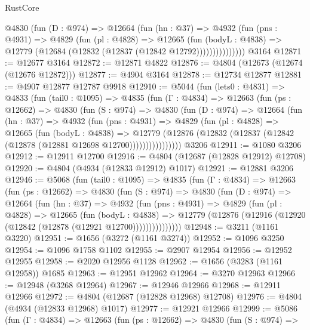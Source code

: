 \begin{lexlean}{RustCore}
\begin{coremodule}
              @4830
                (fun (D : @974) =>
                @12664
                  (fun (hn : @37) =>
                  @4932
                    (fun (pns : @4931) =>
                    @4829
                      (fun (pl : @4828) =>
                      @12665
                        (fun (bodyL : @4838) =>
                        @12779 (@12684 (@12832 (@12837 (@12842 @12792)))))))))))))))
    @3164
@12871 := @12677 @3164
@12872 := @12871 @4822
@12876 := @4804 (@12673 (@12674 (@12676 @12872)))
@12877 := @4904 @3164
@12878 := @12734 @12877
@12881 := @4907 @12877 @12787 @9918
@12910 := @5044
    (fun (lets0 : @4831) =>
    @4833
      (fun (tail0 : @1095) =>
      @4835
        (fun (Γ : @4834) =>
        @12663
          (fun (ps : @12662) =>
          @4830
            (fun (S : @974) =>
            @4830
              (fun (D : @974) =>
              @12664
                (fun (hn : @37) =>
                @4932
                  (fun (pns : @4931) =>
                  @4829
                    (fun (pl : @4828) =>
                    @12665
                      (fun (bodyL : @4838) =>
                      @12779
                        (@12876
                          (@12832 (@12837 (@12842 (@12878 (@12881 @12698 @12700))))))))))))))))
    @3206
@12911 := @1080 @3206
@12912 := @12911 @12700
@12916 := @4804 (@12687 (@12828 @12912) @12708)
@12920 := @4804 (@4934 (@12833 @12912) @1017)
@12921 := @12881 @3206
@12946 := @5068
    (fun (tail0 : @1095) =>
    @4835
      (fun (Γ : @4834) =>
      @12663
        (fun (ps : @12662) =>
        @4830
          (fun (S : @974) =>
          @4830
            (fun (D : @974) =>
            @12664
              (fun (hn : @37) =>
              @4932
                (fun (pns : @4931) =>
                @4829
                  (fun (pl : @4828) =>
                  @12665
                    (fun (bodyL : @4838) =>
                    @12779 (@12876 (@12916 (@12920 (@12842 (@12878 (@12921 @12700)))))))))))))))
@12948 := @3211 (@1161 @3220)
@12951 := @1656 (@3272 (@1161 @3274))
@12952 := @1096 @3250
@12954 := @1096 @1758 @1102
@12955 := @2907 @12954
@12956 := @12952 @12955
@12958 := @2020 @12956 @1128
@12962 := @1656 (@3283 (@1161 @12958)) @1685
@12963 := @12951 @12962
@12964 := @3270 @12963
@12966 := @12948 (@3268 @12964)
@12967 := @12946 @12966
@12968 := @12911 @12966
@12972 := @4804 (@12687 (@12828 @12968) @12708)
@12976 := @4804 (@4934 (@12833 @12968) @1017)
@12977 := @12921 @12966
@12999 := @5086
    (fun (Γ : @4834) =>
    @12663
      (fun (ps : @12662) =>
      @4830
        (fun (S : @974) =>

\end{coremodule}
\end{lexlean}
